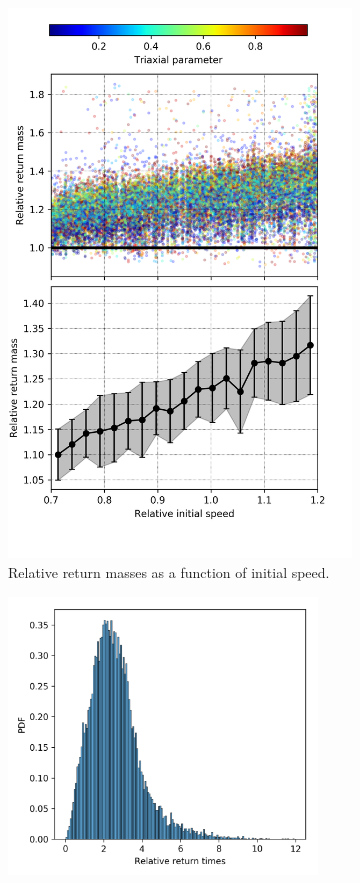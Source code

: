 \begin{figure}[h!]
\begin{subfigure}[b]{0.49\textwidth}
			\includegraphics[width = \textwidth]{"../Files/Week 14/relative_mass"}
			\caption{Relative return masses as a function of initial speed.}
			\label{fig: relMass}
		\end{subfigure}
		\begin{subfigure}[b]{0.49\textwidth}
			\includegraphics[width = 0.9\textwidth]{"../Files/Week 14/relative_times_dist"}

\end{subfigure}
\end{figure}
